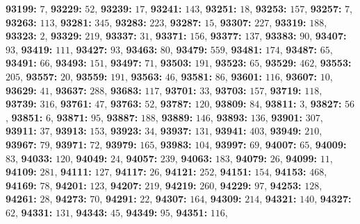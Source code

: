 \textsf{\bfseries 93199:} $7$, \textsf{\bfseries 93229:} $52$, \textsf{\bfseries 93239:} $17$, \textsf{\bfseries 93241:} $143$, \textsf{\bfseries 93251:} $18$, \textsf{\bfseries 93253:} $157$, \textsf{\bfseries 93257:} $7$, \textsf{\bfseries 93263:} $113$, \textsf{\bfseries 93281:} $345$, \textsf{\bfseries 93283:} $223$, \textsf{\bfseries 93287:} $15$, \textsf{\bfseries 93307:} $227$, \textsf{\bfseries 93319:} $188$, \textsf{\bfseries 93323:} $2$, \textsf{\bfseries 93329:} $219$, \textsf{\bfseries 93337:} $31$, \textsf{\bfseries 93371:} $156$, \textsf{\bfseries 93377:} $137$, \textsf{\bfseries 93383:} $90$, \textsf{\bfseries 93407:} $93$, \textsf{\bfseries 93419:} $111$, \textsf{\bfseries 93427:} $93$, \textsf{\bfseries 93463:} $80$, \textsf{\bfseries 93479:} $559$, \textsf{\bfseries 93481:} $174$, \textsf{\bfseries 93487:} $65$, \textsf{\bfseries 93491:} $66$, \textsf{\bfseries 93493:} $151$, \textsf{\bfseries 93497:} $71$, \textsf{\bfseries 93503:} $191$, \textsf{\bfseries 93523:} $65$, \textsf{\bfseries 93529:} $462$, \textsf{\bfseries 93553:} $205$, \textsf{\bfseries 93557:} $20$, \textsf{\bfseries 93559:} $191$, \textsf{\bfseries 93563:} $46$, \textsf{\bfseries 93581:} $86$, \textsf{\bfseries 93601:} $116$, \textsf{\bfseries 93607:} $10$, \textsf{\bfseries 93629:} $41$, \textsf{\bfseries 93637:} $288$, \textsf{\bfseries 93683:} $117$, \textsf{\bfseries 93701:} $33$, \textsf{\bfseries 93703:} $157$, \textsf{\bfseries 93719:} $118$, \textsf{\bfseries 93739:} $316$, \textsf{\bfseries 93761:} $47$, \textsf{\bfseries 93763:} $52$, \textsf{\bfseries 93787:} $120$, \textsf{\bfseries 93809:} $84$, \textsf{\bfseries 93811:} $3$, \textsf{\bfseries 93827:} $56$, \textsf{\bfseries 93851:} $6$, \textsf{\bfseries 93871:} $95$, \textsf{\bfseries 93887:} $188$, \textsf{\bfseries 93889:} $146$, \textsf{\bfseries 93893:} $136$, \textsf{\bfseries 93901:} $307$, \textsf{\bfseries 93911:} $37$, \textsf{\bfseries 93913:} $153$, \textsf{\bfseries 93923:} $34$, \textsf{\bfseries 93937:} $131$, \textsf{\bfseries 93941:} $403$, \textsf{\bfseries 93949:} $210$, \textsf{\bfseries 93967:} $79$, \textsf{\bfseries 93971:} $72$, \textsf{\bfseries 93979:} $165$, \textsf{\bfseries 93983:} $104$, \textsf{\bfseries 93997:} $69$, \textsf{\bfseries 94007:} $65$, \textsf{\bfseries 94009:} $83$, \textsf{\bfseries 94033:} $120$, \textsf{\bfseries 94049:} $24$, \textsf{\bfseries 94057:} $239$, \textsf{\bfseries 94063:} $183$, \textsf{\bfseries 94079:} $26$, \textsf{\bfseries 94099:} $11$, \textsf{\bfseries 94109:} $281$, \textsf{\bfseries 94111:} $127$, \textsf{\bfseries 94117:} $26$, \textsf{\bfseries 94121:} $252$, \textsf{\bfseries 94151:} $154$, \textsf{\bfseries 94153:} $468$, \textsf{\bfseries 94169:} $78$, \textsf{\bfseries 94201:} $123$, \textsf{\bfseries 94207:} $219$, \textsf{\bfseries 94219:} $260$, \textsf{\bfseries 94229:} $97$, \textsf{\bfseries 94253:} $128$, \textsf{\bfseries 94261:} $28$, \textsf{\bfseries 94273:} $70$, \textsf{\bfseries 94291:} $22$, \textsf{\bfseries 94307:} $164$, \textsf{\bfseries 94309:} $214$, \textsf{\bfseries 94321:} $140$, \textsf{\bfseries 94327:} $62$, \textsf{\bfseries 94331:} $131$, \textsf{\bfseries 94343:} $45$, \textsf{\bfseries 94349:} $95$, \textsf{\bfseries 94351:} $116$, 

